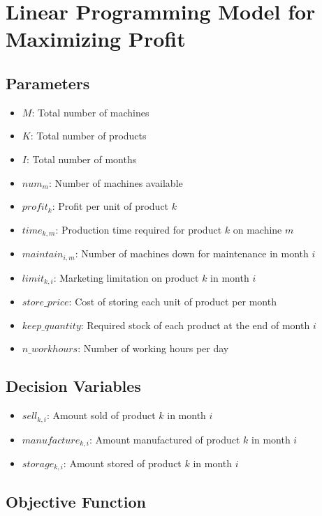 \documentclass{article}
\begin{document}
\section*{Linear Programming Model for Maximizing Profit}

\subsection*{Parameters}

\begin{itemize}
    \item $M$: Total number of machines
    \item $K$: Total number of products
    \item $I$: Total number of months
    \item $num_m$: Number of machines available
    \item $profit_k$: Profit per unit of product $k$
    \item $time_{k, m}$: Production time required for product $k$ on machine $m$
    \item $maintain_{i, m}$: Number of machines down for maintenance in month $i$
    \item $limit_{k, i}$: Marketing limitation on product $k$ in month $i$
    \item $store\_price$: Cost of storing each unit of product per month
    \item $keep\_quantity$: Required stock of each product at the end of month $i$
    \item $n\_workhours$: Number of working hours per day
\end{itemize}

\subsection*{Decision Variables}

\begin{itemize}
    \item $sell_{k, i}$: Amount sold of product $k$ in month $i$
    \item $manufacture_{k, i}$: Amount manufactured of product $k$ in month $i$
    \item $storage_{k, i}$: Amount stored of product $k$ in month $i$
\end{itemize}

\subsection*{Objective Function}
\end{document}
